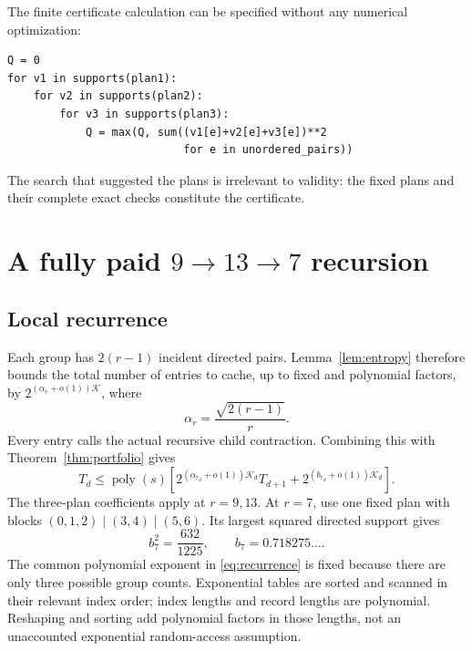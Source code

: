 \documentclass[11pt]{article}
\theoremstyle{remark}\newtheorem{remark}[theorem]{Remark}
\newcommand{\K}{\mathcal K}
\newcommand{\poly}{\operatorname{poly}}
\begin{document}
The finite certificate calculation can be specified without any numerical
optimization:
\begin{lstlisting}
Q = 0
for v1 in supports(plan1):
    for v2 in supports(plan2):
        for v3 in supports(plan3):
            Q = max(Q, sum((v1[e]+v2[e]+v3[e])**2
                           for e in unordered_pairs))
\end{lstlisting}
The search that suggested the plans is irrelevant to validity: the fixed
plans and their complete exact checks constitute the certificate.

\section{A fully paid \texorpdfstring{$9\to13\to7$}{9 to 13 to 7} recursion}
\label{sec:recurrence}

\subsection{Local recurrence}
Each group has $2(r-1)$ incident directed pairs. Lemma~\ref{lem:entropy}
therefore bounds the total number of entries to cache, up to fixed and
polynomial factors, by $2^{(\alpha_r+o(1))\K}$, where
\[
 \alpha_r=\frac{\sqrt{2(r-1)}}r.
\]
Every entry calls the actual recursive child contraction. Combining this
with Theorem~\ref{thm:portfolio} gives
\begin{equation}
 T_d\le\poly(s)\left[
       2^{(\alpha_{r_d}+o(1))\K_d}T_{d+1}
       +2^{(b_{r_d}+o(1))\K_d}\right].
 \label{eq:recurrence}
\end{equation}
The three-plan coefficients apply at $r=9,13$. At $r=7$, use one fixed
plan with blocks $(0,1,2)\mid(3,4)\mid(5,6)$. Its largest squared
directed support gives
\[
 b_7^2=\frac{632}{1225},\qquad b_7=0.718275\ldots.
\]
The common polynomial exponent in \eqref{eq:recurrence} is fixed because
there are only three possible group counts. Exponential tables are sorted
and scanned in their relevant index order; index lengths and record lengths
are polynomial. Reshaping and sorting add polynomial factors in those
lengths, not an unaccounted exponential random-access assumption.
\end{document}
